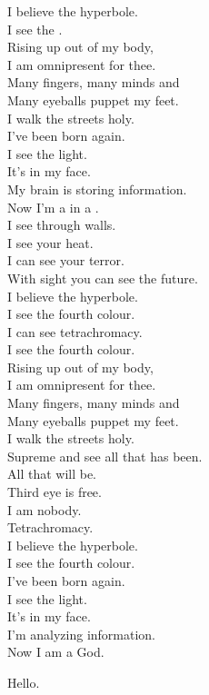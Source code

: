

I believe the hyperbole. \\
I see the . \\

Rising up out of my body, \\
I am omnipresent for thee. \\
Many fingers, many minds and \\
Many eyeballs puppet my feet. \\
I walk the streets holy. \\

I've been born again. \\
I see the light. \\
It's in my face. \\
My brain is storing information. \\
Now I'm a  in a . \\

I see through walls. \\
I see your heat. \\
I can see your terror. \\
With sight you can see the future. \\

I believe the hyperbole. \\
I see the fourth colour. \\
I can see tetrachromacy. \\
I see the fourth colour. \\

Rising up out of my body, \\
I am omnipresent for thee. \\
Many fingers, many minds and \\
Many eyeballs puppet my feet. \\
I walk the streets holy. \\
Supreme and see all that has been. \\

All that will be. \\
Third eye is free. \\
I am nobody. \\
Tetrachromacy. \\

I believe the hyperbole. \\
I see the fourth colour. \\

I've been born again. \\
I see the light. \\
It's in my face. \\
I'm analyzing information. \\
Now I am a God. \\



Hello. \\
